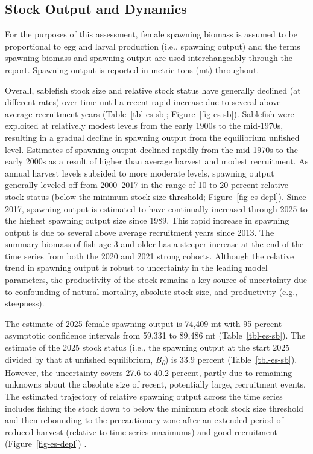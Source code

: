 \documentclass[
  english,
]{article}
\begin{document}
\subsection*{Stock Output and Dynamics}\label{stock-output-and-dynamics}

For the purposes of this assessment, female spawning biomass is assumed
to be proportional to egg and larval production (i.e., spawning output)
and the terms spawning biomass and spawning output are used
interchangeably through the report. Spawning output is reported in
metric tons (mt) throughout.

Overall, sablefish stock size and relative stock status have generally
declined (at different rates) over time until a recent rapid increase
due to several above average recruitment years (Table~\ref{tbl-es-sb};
Figure~\ref{fig-es-sb}). Sablefish were exploited at relatively modest
levels from the early 1900s to the mid-1970s, resulting in a gradual
decline in spawning output from the equilibrium unfished level.
Estimates of spawning output declined rapidly from the mid-1970s to the
early 2000s as a result of higher than average harvest and modest
recruitment. As annual harvest levels subsided to more moderate levels,
spawning output generally leveled off from 2000--2017 in the range of 10
to 20 percent relative stock status (below the minimum stock size
threshold; Figure~\ref{fig-es-depl}). Since 2017, spawning output is
estimated to have continually increased through 2025 to the highest
spawning output size since 1989. This rapid increase in spawning output
is due to several above average recruitment years since 2013. The
summary biomass of fish age 3 and older has a steeper increase at the
end of the time series from both the 2020 and 2021 strong cohorts.
Although the relative trend in spawning output is robust to uncertainty
in the leading model parameters, the productivity of the stock remains a
key source of uncertainty due to confounding of natural mortality,
absolute stock size, and productivity (e.g., steepness).

The estimate of 2025 female spawning output is 74,409 mt with 95 percent
asymptotic confidence intervals from 59,331 to 89,486 mt
(Table~\ref{tbl-es-sb}). The estimate of the 2025 stock status (i.e.,
the spawning output at the start 2025 divided by that at unfished
equilibrium, \emph{B\textsubscript{0}}) is 33.9 percent
(Table~\ref{tbl-es-sb}). However, the uncertainty covers 27.6 to 40.2
percent, partly due to remaining unknowns about the absolute size of
recent, potentially large, recruitment events. The estimated trajectory
of relative spawning output across the time series includes fishing the
stock down to below the minimum stock stock size threshold and then
rebounding to the precautionary zone after an extended period of reduced
harvest (relative to time series maximums) and good recruitment
(Figure~\ref{fig-es-depl}) .
\end{document}
